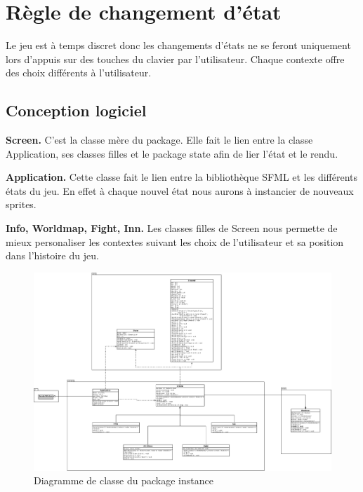 \documentclass[12pt,a4paper]{report}
\begin{document}
\chapter{R\`{e}gle de changement d'\'{e}tat}

Le jeu est \`{a} temps discret donc les changements d'\'{e}tats ne se feront uniquement lors d'appuis sur des touches du clavier par l'utilisateur. Chaque contexte offre des choix diff\'{e}rents \`{a} l'utilisateur. 

\section{Conception logiciel}

\textbf{Screen.} C'est la classe m\`{e}re du package. Elle fait le lien entre la classe Application, ses classes filles et le package state afin de lier l'\'{e}tat et le rendu.

\textbf{Application.} Cette classe fait le lien entre la biblioth\`{e}que SFML et les diff\'{e}rents \'{e}tats du jeu. En effet \`{a} chaque nouvel \'{e}tat nous aurons \`{a} instancier de nouveaux sprites.

\textbf{Info, Worldmap, Fight, Inn.} Les classes filles de Screen nous permette de mieux personaliser les contextes suivant les choix de l'utilisateur et sa position dans l'histoire du jeu.

\begin{figure}
\caption{Diagramme de classe du package instance}
\includegraphics[width=1\textwidth]{instance.jpeg}
\end{figure}
\end{document}
